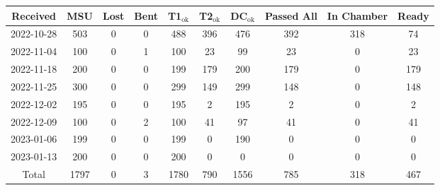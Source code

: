 \begin{tabular}{|c|c|c|c|c|c|c|c|c|c|}
\hline
  Received &  MSU &  Lost &  Bent &  T1$_\text{ok}$ &  T2$_\text{ok}$ &  DC$_\text{ok}$ &  Passed All &  In Chamber &  Ready \\\hline

2022-10-28 &  503 &     0 &     0 &             488 &             396 &             476 &         392 &         318 &     74 \\\hline
2022-11-04 &  100 &     0 &     1 &             100 &              23 &              99 &          23 &           0 &     23 \\\hline
2022-11-18 &  200 &     0 &     0 &             199 &             179 &             200 &         179 &           0 &    179 \\\hline
2022-11-25 &  300 &     0 &     0 &             299 &             149 &             299 &         148 &           0 &    148 \\\hline
2022-12-02 &  195 &     0 &     0 &             195 &               2 &             195 &           2 &           0 &      2 \\\hline
2022-12-09 &  100 &     0 &     2 &             100 &              41 &              97 &          41 &           0 &     41 \\\hline
2023-01-06 &  199 &     0 &     0 &             199 &               0 &             190 &           0 &           0 &      0 \\\hline
2023-01-13 &  200 &     0 &     0 &             200 &               0 &               0 &           0 &           0 &      0 \\\hline
     Total & 1797 &     0 &     3 &            1780 &             790 &            1556 &         785 &         318 &    467 \\\hline

\end{tabular}
